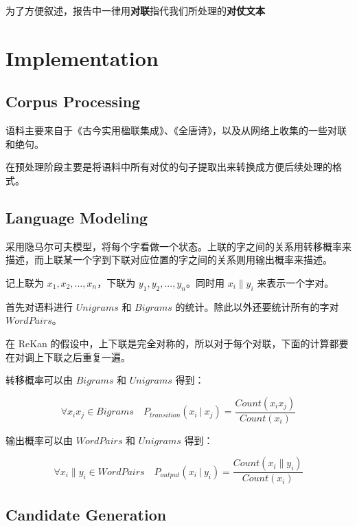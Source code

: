 \documentclass[12pt]{article}
\newcommand\given[1][]{\:#1\vert\:}
\begin{document}
为了方便叙述，报告中一律用\textbf{对联}指代我们所处理的\textbf{对仗文本}

\newpage

\section{Implementation}

\subsection{Corpus Processing}

语料主要来自于《古今实用楹联集成》、《全唐诗》，以及从网络上收集的一些对联和绝句。

在预处理阶段主要是将语料中所有对仗的句子提取出来转换成方便后续处理的格式。

\subsection{Language Modeling}

采用隐马尔可夫模型，将每个字看做一个状态。上联的字之间的关系用转移概率来描述，而上联某一个字到下联对应位置的字之间的关系则用输出概率来描述。

记上联为 $x_1, x_2, ..., x_n$，下联为 $y_1, y_2, ..., y_n$。同时用 $x_i \| y_i$ 来表示一个字对。

首先对语料进行 $Unigrams$ 和 $Bigrams$ 的统计。除此以外还要统计所有的字对 $WordPairs$。

在 ReKan 的假设中，上下联是完全对称的，所以对于每个对联，下面的计算都要在对调上下联之后重复一遍。

转移概率可以由 $Bigrams$ 和 $Unigrams$ 得到：

\begin{equation}
\forall x_i x_j \in Bigrams \quad P_{transition}(x_i \given x_j) = \frac{Count(x_i x_j)}{Count(x_i)}
\end{equation}


输出概率可以由 $WordPairs$ 和 $Unigrams$ 得到：

\begin{equation}
\forall x_i \| y_i \in WordPairs \quad P_{output}(x_i \given y_i) = \frac{Count(x_i \| y_i)}{Count(x_i)}
\end{equation}

\subsection{Candidate Generation}
\end{document}
